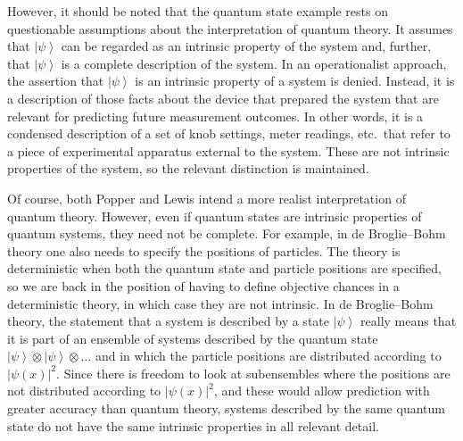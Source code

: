 \documentclass[DIV=calc,fontsize=12pt]{scrartcl} %
\theoremstyle{definition}
\theoremstyle{plain}
\newcommand{\Ket}[1]{\ensuremath{\left \vert #1 \right \rangle}}
\begin{document}
However, it should be noted that the quantum state example rests on
questionable assumptions about the interpretation of quantum theory.
It assumes that $\Ket{\psi}$ can be regarded as an intrinsic property
of the system and, further, that $\Ket{\psi}$ is a complete
description of the system.  In an operationalist approach, the
assertion that $\Ket{\psi}$ is an intrinsic property of a system is
denied.  Instead, it is a description of those facts about the device
that prepared the system that are relevant for predicting future
measurement outcomes.  In other words, it is a condensed description
of a set of knob settings, meter readings, etc.\ that refer to a piece
of experimental apparatus external to the system.  These are not
intrinsic properties of the system, so the relevant distinction is
maintained.

Of course, both Popper and Lewis intend a more realist interpretation
of quantum theory.  However, even if quantum states are intrinsic
properties of quantum systems, they need not be complete.  For
example, in de Broglie--Bohm theory one also needs to specify the
positions of particles.  The theory is deterministic when both the
quantum state and particle positions are specified, so we are back in
the position of having to define objective chances in a deterministic
theory, in which case they are not intrinsic.  In de Broglie--Bohm
theory, the statement that a system is described by a state
$\Ket{\psi}$ really means that it is part of an ensemble of systems
described by the quantum state $\Ket{\psi} \otimes \Ket{\psi} \otimes
\ldots$ and in which the particle positions are distributed according
to $\left | \psi(x) \right |^2$.  Since there is freedom to look at
subensembles where the positions are not distributed according to
$\left | \psi(x) \right |^2$, and these would allow prediction with
greater accuracy than quantum theory, systems described by the same
quantum state do not have the same intrinsic properties in all
relevant detail.
\end{document}
